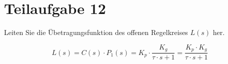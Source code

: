 \section{Teilaufgabe 12}
\begin{aufgabe}
    Leiten Sie die Übetragungsfunktion des offenen Regelkreises $L(s)$ her.
\end{aufgabe}
\[ L(s) = C(s) \cdot P_1(s) = K_p \cdot \frac{K_g}{\tau \cdot s + 1} 
    = \frac{K_p \cdot K_g}{\tau \cdot s + 1} \]
